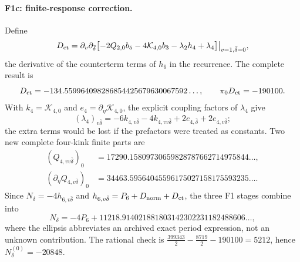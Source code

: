 \documentclass[11pt,a4paper]{article}
\numberwithin{equation}{section}
\newcommand{\db}{\bar\delta}
\begin{document}
\paragraph{F1c: finite-response correction.} Define
\begin{equation}
 D_{\rm ct}=\partial_v\partial_{\db}\bigl[-2Q_{2,0}b_5-4\mathcal K_{4,0}b_3-\lambda_2h_4+\lambda_4\bigr]\big|_{v=1,\db=0},
\end{equation}
the derivative of the counterterm terms of $h_6$ in the recurrence. The complete result is
\begin{equation}
 D_{\rm ct}=-134.559964098286854425679630067592\ldots,\qquad \pi_0D_{\rm ct}=-190100.
\end{equation}
With $k_4=\mathcal K_{4,0}$ and $e_4=\partial_\eta\mathcal K_{4,0}$, the explicit coupling factors of $\lambda_4$ give
\begin{equation}
 (\lambda_4)_{v\db}=-6k_{4,v\db}-4k_{4,vv\db}+2e_{4,\db}+2e_{4,v\db};
\end{equation}
the extra terms would be lost if the prefactors were treated as constants. Two new complete four-kink finite parts are
\begin{equation}
\begin{aligned}
 (Q_{4,vv\db})_0&=17290.15809730659828787662714975844\ldots,\\
 (\partial_\eta Q_{4,v\db})_0&=34463.59564045596175027158175593235\ldots .
\end{aligned}
\end{equation}
Since $N_\delta=-4h_{6,v\db}$ and $h_{6,v\db}=P_6+D_{\rm norm}+D_{\rm ct}$, the three F1 stages combine into
\begin{equation}
 N_\delta=-4P_6+11218.914021881803142302231182488606\ldots ,
 \label{eq:dualC:NdP6}
\end{equation}
where the ellipsis abbreviates an archived exact period expression, not an unknown contribution. The rational check is
$\frac{399343}{2}-\frac{8719}{2}-190100=5212$, hence $N_\delta^{(0)}=-20848$.
\end{document}
